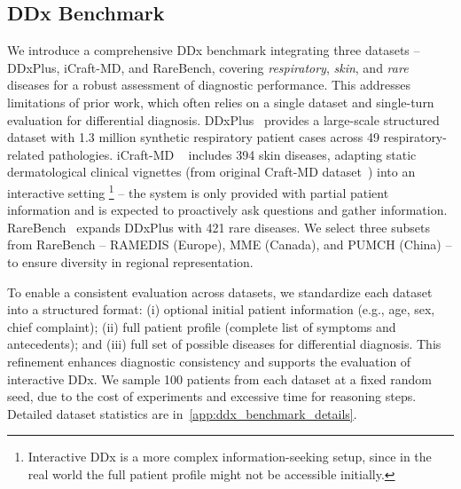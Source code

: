 %
\subsection{DDx Benchmark}
\label{subsec:ddx_benchmark}

We introduce a comprehensive DDx benchmark integrating three datasets -- DDxPlus, iCraft-MD, and RareBench, covering \textit{respiratory}, \textit{skin}, and \textit{rare} diseases for a robust assessment of diagnostic performance. This addresses limitations of prior work, which often relies on a single dataset and single-turn evaluation for differential diagnosis. DDxPlus~\citep{fansi2022ddxplus} provides a large-scale structured dataset with 1.3 million synthetic respiratory patient cases across 49 respiratory-related pathologies. iCraft-MD ~\citep{li2024mediq} includes 394 skin diseases, adapting static dermatological clinical vignettes (from original Craft-MD dataset~\citep{johri2024craft, johri2025craftmd}) into an interactive setting%
\footnote{Interactive DDx is a more complex information-seeking setup, since in the real world the full patient profile might not be accessible initially.} -- the system is only provided with partial patient information and is expected to proactively ask questions and gather information. %
RareBench~\citep{chen2024rarebench} expands DDxPlus with 421 rare diseases. We select three subsets from RareBench -- RAMEDIS (Europe), MME (Canada), and PUMCH (China) -- to ensure diversity in regional representation.

To enable a consistent evaluation across datasets, we standardize each dataset into a structured format: (i) optional initial patient information (e.g., age, sex, chief complaint); (ii) full patient profile (complete list of symptoms and antecedents); and (iii) full set of possible diseases for differential diagnosis. %
This refinement enhances diagnostic consistency and supports the evaluation of interactive DDx. We sample 100 patients from each dataset at a fixed random seed, due to the cost of experiments and excessive time for reasoning steps. Detailed dataset statistics are in~\autoref{app:ddx_benchmark_details}.


